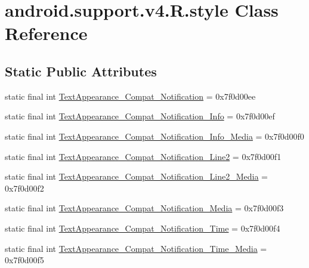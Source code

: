 \hypertarget{classandroid_1_1support_1_1v4_1_1_r_1_1style}{}\section{android.\+support.\+v4.\+R.\+style Class Reference}
\label{classandroid_1_1support_1_1v4_1_1_r_1_1style}
\subsection*{Static Public Attributes}
\begin{DoxyCompactItemize}
\item 
static final int \mbox{\hyperlink{classandroid_1_1support_1_1v4_1_1_r_1_1style_ac94662c8dd52c4f6a0fbee17e0eb54ff}{Text\+Appearance\+\_\+\+Compat\+\_\+\+Notification}} = 0x7f0d00ee
\item 
static final int \mbox{\hyperlink{classandroid_1_1support_1_1v4_1_1_r_1_1style_a0e51b06e195b1fb1e838fe2f5e7ae7e9}{Text\+Appearance\+\_\+\+Compat\+\_\+\+Notification\+\_\+\+Info}} = 0x7f0d00ef
\item 
static final int \mbox{\hyperlink{classandroid_1_1support_1_1v4_1_1_r_1_1style_a8dce3afd579fb41d2902a6cef3828673}{Text\+Appearance\+\_\+\+Compat\+\_\+\+Notification\+\_\+\+Info\+\_\+\+Media}} = 0x7f0d00f0
\item 
static final int \mbox{\hyperlink{classandroid_1_1support_1_1v4_1_1_r_1_1style_a6b4e9488a20b85c43c26d5d77d09b760}{Text\+Appearance\+\_\+\+Compat\+\_\+\+Notification\+\_\+\+Line2}} = 0x7f0d00f1
\item 
static final int \mbox{\hyperlink{classandroid_1_1support_1_1v4_1_1_r_1_1style_a9605a49d3ebf0803cac79ee89c05d0cb}{Text\+Appearance\+\_\+\+Compat\+\_\+\+Notification\+\_\+\+Line2\+\_\+\+Media}} = 0x7f0d00f2
\item 
static final int \mbox{\hyperlink{classandroid_1_1support_1_1v4_1_1_r_1_1style_a02c08068d2926ff072a48b5aedb76ebb}{Text\+Appearance\+\_\+\+Compat\+\_\+\+Notification\+\_\+\+Media}} = 0x7f0d00f3
\item 
static final int \mbox{\hyperlink{classandroid_1_1support_1_1v4_1_1_r_1_1style_aa49cbc625aa81f01d617a7ecdde4aebb}{Text\+Appearance\+\_\+\+Compat\+\_\+\+Notification\+\_\+\+Time}} = 0x7f0d00f4
\item 
static final int \mbox{\hyperlink{classandroid_1_1support_1_1v4_1_1_r_1_1style_a3af7ceef44d72df72ff3e9f95525a508}{Text\+Appearance\+\_\+\+Compat\+\_\+\+Notification\+\_\+\+Time\+\_\+\+Media}} = 0x7f0d00f5

\end{DoxyCompactItemize}
